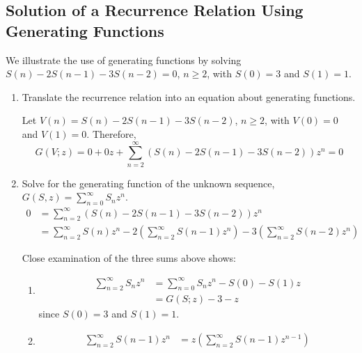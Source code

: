 \documentclass[10pt,]{book}
\theoremstyle{plain}
\theoremstyle{definition}
\theoremstyle{definition}
\theoremstyle{definition}
\theoremstyle{definition}
\numberwithin{equation}{section}
\begin{document}
\subsection[Solution of a Recurrence Relation Using Generating Functions]{Solution of a Recurrence Relation Using Generating Functions}\label{ss-solution-of-rr-using-generating-functions}
We illustrate the use of generating functions by solving
 \(S(n) - 2S(n - 1) - 3S(n - 2) = 0\), \(n \geq  2\), with \(S(0) = 3\) and \(S(1) = 1\).%
\par
\leavevmode%
\begin{enumerate}[label=\arabic*]
\item\hypertarget{li-120}{} Translate the recurrence relation into an equation about generating functions.%
\par
Let \(V(n) = S(n) - 2S (n - 1) - 3S (n - 2)\), \(n \geq  2\), with \(V(0) = 0\) and \(V(1) = 0\). Therefore,
\[G(V;z) = 0 + 0z +\sum_{n=2}^{\infty}  (S(n) - 2S (n - 1) - 3S (n - 2)) z^n= 0\]
%
\item\hypertarget{li-121}{}Solve for the generating function of the unknown sequence, \(G(S,z) = \sum_{n=0}^{\infty} S_n z^n\).
 \begin{equation*}
 \begin{split}
 0 & =\sum_{n=2}^{\infty}  {(S(n) - 2S (n - 1) - 3 S (n - 2)) z^n}\\
 	& =\sum_{n=2}^{\infty} {S(n) z^n-2} \left(\sum_{n=2}^{\infty
} S(n-1) z^n\right)-3\left(\sum_{n=2}^{\infty} S(n-2) z^n\right)
\end{split}
\end{equation*}
%
\par
Close examination of the three sums above shows:%
\par
%
\begin{enumerate}[label=\alph*]
\item\hypertarget{li-122}{}
\begin{equation*}
\begin{split}
\sum_{n=2}^{\infty} S_n z^n &=\sum_{n=0}^{\infty} S_n z^n - S(0)-S(1)z\\
			&= G(S;z)-3-z
\end{split}
\end{equation*}
since \(S(0)=3\) and \(S(1)=1\).%
\item\hypertarget{li-123}{}
\begin{equation*}
\begin{split}
\sum_{n=2}^{\infty} S(n-1) z^n &=z\left(\sum_{n=2}^{\infty} S(n-1) z^{n-1}\right)\\

\end{split}
\end{equation*}
\end{enumerate}
\end{enumerate}
\end{document}
